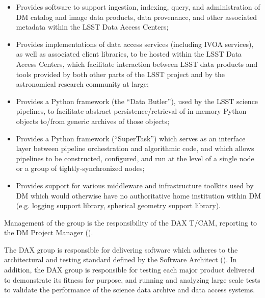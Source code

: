 \begin{itemize}

  \item{Provides software to support ingestion, indexing, query, and administration of \gls{DM} catalog and image
  data products, data \gls{provenance}, and other associated \gls{metadata} within the \gls{LSST} Data Access Centers;}

  \item{Provides implementations of data access services (including \gls{IVOA} services), as well as associated
  client libraries, to be hosted within the \gls{LSST} Data Access Centers, which facilitate interaction between
  \gls{LSST} data products and tools provided by both other parts of the \gls{LSST} project and by the astronomical
  research community at large;}

  \item{Provides a Python framework (the ``Data \gls{Butler}''), used by the \gls{LSST} science pipelines, to facilitate
  abstract persistence/retrieval of in-memory Python objects to/from generic archives of those objects;}

  \item{Provides a Python framework (``SuperTask'') which serves as an interface layer between \gls{pipeline}
  orchestration and algorithmic code, and which allows pipelines to be constructed, configured, and run at
  the level of a single node or a group of tightly-synchronized nodes;}

  \item{Provides support for various middleware and infrastructure toolkits used by \gls{DM} which would otherwise
  have no authoritative home institution within DM (e.g. logging support library, spherical geometry support
  library).}

\end{itemize}

Management of the group is the responsibility of the \gls{DAX} \gls{T/CAM}, reporting to the \gls{DM} \gls{Project Manager}
().

The \gls{DAX} group is responsible for delivering software which adheres to the architectural and testing standard
defined by the Software Architect (). In addition, the \gls{DAX} group is responsible for
testing each major product delivered to demonstrate its fitness for purpose, and running and analyzing large
scale tests to validate the performance of the science data archive and data access systems.

